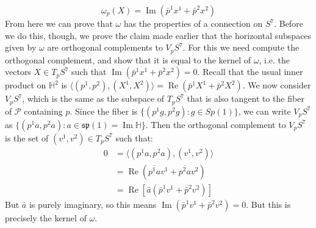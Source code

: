 \documentclass{book}
\newcommand{\HH}{\mathbb{H}}
\DeclareMathOperator{\Real}{Re}
\DeclareMathOperator{\Imag}{Im}
\theoremstyle{plain}
\theoremstyle{definition}
\theoremstyle{remark}
\begin{document}
\[       \omega_p(X) = \Imag(\bar p^1 x^1 + \bar p^2 x^2)  \]
From here we can prove that $\omega$ has the properties of a connection on $S^7$. Before we do this, though, we prove the claim made earlier that the horizontal subspaces given by $\omega$ are orthogonal complements to $V_p S^7$. For this we need compute the orthogonal complement, and show that it is equal to the kernel of $\omega$, i.e. the vectors $X \in T_p S^7$ such that $\Imag(\bar p^1 x^1 + \bar p^2 x^2) = 0$. Recall that the usual inner product on $\HH^2$ is $\langle  (p^1, p^2) , (X^1, X^2) \rangle = \Real(\bar p^1 X^1 + \bar p^2 X^2)$. We now consider $V_p S^7$, which is the same as the subspace of $T_p S^7$ that is also tangent to the fiber of $\mathcal{P}$ containing $p$. Since the fiber is $\{ (p^1 g, p^2 g) : g\in Sp(1) \}$, we can write $V_p S^7$ as $\{ (p^1 a, p^2 a) : a \in \mathfrak{sp}(1) = \Imag \HH \}$. Then the orthogonal complement to $V_p S^7$ is the set of $(v^1, v^2) \in T_p S^7$ such that:
\begin{align*}
0 &= \langle (p^1 a, p^2 a), (v^1, v^2) \rangle \\
&= \Real(\overline{p^1 a} v^1 + \overline{p^2 a} v^2) \\
&= \Real[\bar a (\bar p^1 v^1 + \bar p^2 v^2)]
\end{align*}
But $\bar a$ is purely imaginary, so this means $\Imag(\bar p^1 v^1 + \bar p^2 v^2) = 0$. But this is precisely the kernel of $\omega$.
\end{document}
